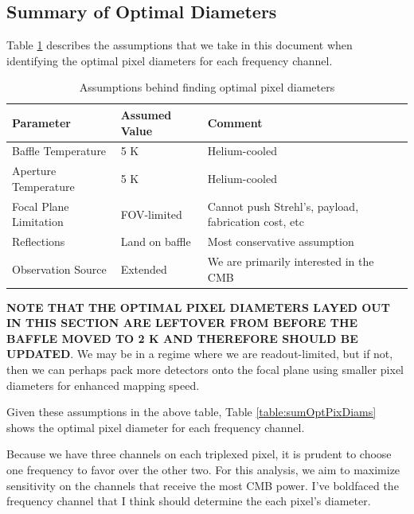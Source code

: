 \documentclass[12pt, titlepage]{article} %
\begin{document}

\subsection{Summary of Optimal Diameters \label{subsec:OptDiams}}

Table \ref{table:optDiamsAssumps} describes the assumptions that we take in this document when identifying the optimal pixel diameters for each frequency channel.

\begin{table}[H]
\centering
	\begin{tabularx}{\textwidth}{|| X | X | X ||}
	\hline
	Parameter & Assumed Value & Comment \\ 	
	\hline
	\hline
	Baffle Temperature & 5 K & Helium-cooled \\
	\hline
	Aperture Temperature & 5 K & Helium-cooled \\
	\hline
	Focal Plane Limitation & FOV-limited & Cannot push Strehl's, payload, fabrication cost, etc \\
	\hline
	Reflections & Land on baffle & Most conservative assumption \\
	\hline
	Observation Source & Extended & We are primarily interested in the CMB \\
	\hline
	\end{tabularx}
\caption{Assumptions behind finding optimal pixel diameters \label{table:optDiamsAssumps}}
\end{table}

\textbf{NOTE THAT THE OPTIMAL PIXEL DIAMETERS LAYED OUT IN THIS SECTION ARE LEFTOVER FROM BEFORE THE BAFFLE MOVED TO 2 K AND THEREFORE SHOULD BE UPDATED}. We may be in a regime where we are readout-limited, but if not, then we can perhaps pack more detectors onto the focal plane using smaller pixel diameters for enhanced mapping speed.

Given these assumptions in the above table, Table \ref{table:sumOptPixDiams} shows the optimal pixel diameter for each frequency channel.

Because we have three channels on each triplexed pixel, it is prudent to choose one frequency to favor over the other two. For this analysis, we aim to maximize sensitivity on the channels that receive the most CMB power. I've boldfaced the frequency channel that I think should determine the each pixel's diameter.
\end{document}

